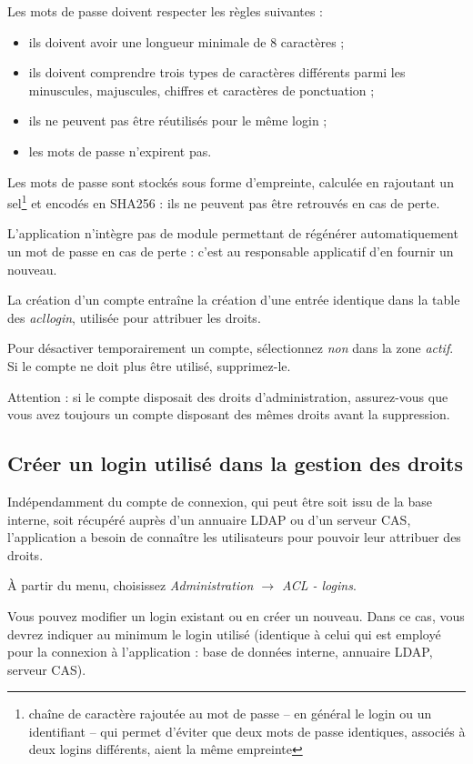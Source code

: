 Les mots de passe doivent respecter les règles suivantes :
\begin{itemize}
\item ils doivent avoir une longueur minimale de 8 caractères ;
\item ils doivent comprendre trois types de caractères différents parmi les minuscules, majuscules, chiffres et caractères de ponctuation ;
\item ils ne peuvent pas être réutilisés pour le même login ;
\item les mots de passe n'expirent pas.
\end{itemize}

Les mots de passe sont stockés sous forme d'empreinte, calculée en rajoutant un sel\footnote{chaîne de caractère rajoutée au mot de passe -- en général le login ou un identifiant -- qui permet d'éviter que deux mots de passe identiques, associés à deux logins différents, aient la même empreinte} et encodés en SHA256 : ils ne peuvent pas être retrouvés en cas de perte.

L'application n'intègre pas de module permettant de régénérer automatiquement un mot de passe en cas de perte : c'est au responsable applicatif d'en fournir un nouveau.

La création d'un compte entraîne la création d'une entrée identique dans la table des \textit{acllogin}, utilisée pour attribuer les droits.

Pour désactiver temporairement un compte, sélectionnez \textit{non} dans la zone \textit{actif}. Si le compte ne doit plus être utilisé, supprimez-le.

Attention : si le compte disposait des droits d'administration, assurez-vous que vous avez toujours un compte disposant des mêmes droits avant la suppression.

\subsection{Créer un login utilisé dans la gestion des droits}

Indépendamment du compte de connexion, qui peut être soit issu de la base interne, soit récupéré auprès d'un annuaire LDAP ou d'un serveur CAS, l'application a besoin de connaître les utilisateurs pour pouvoir leur attribuer des droits.

À partir du menu, choisissez \textit{Administration $\rightarrow$ ACL - logins}.

Vous pouvez modifier un login existant ou en créer un nouveau. Dans ce cas, vous devrez indiquer au minimum le login utilisé (identique à celui qui est employé pour la connexion à l'application : base de données interne, annuaire LDAP, serveur CAS).

